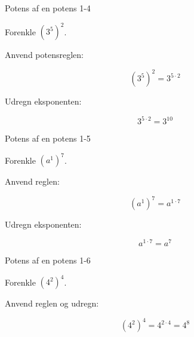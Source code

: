 \documentclass{article}
\begin{document}
\newpage

\begin{exercise}{Potens af en potens 1-4}

Forenkle $(3^5)^2$.


\hint

Anvend potensreglen:

\hint
\[
(3^5)^2 = 3^{5 \cdot 2}
\]

\hint

Udregn eksponenten:

\hint
\[
3^{5 \cdot 2} = 3^{10}
\]

\end{exercise}

\newpage

\begin{exercise}{Potens af en potens 1-5}

Forenkle $(a^1)^7$.


\hint

Anvend reglen:

\hint
\[
(a^1)^7 = a^{1 \cdot 7}
\]

\hint

Udregn eksponenten:

\hint
\[
a^{1 \cdot 7} = a^7
\]

\end{exercise}

\newpage

\begin{exercise}{Potens af en potens 1-6}

Forenkle $(4^2)^4$.


\hint

Anvend reglen og udregn:

\hint
\[
(4^2)^4 = 4^{2 \cdot 4} = 4^8
\]

\end{exercise}
\end{document}
